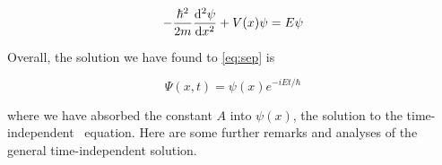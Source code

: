 \begin{tcolorbox}[title = Time-independent \Sch\ equation] \vspace{-2ex}
	\begin{equation*}
		-\frac{\hbar^2}{2m} \dv[2]{\psi}{x} + V(x)\psi = E\psi
	\end{equation*}
\end{tcolorbox}

Overall, the solution we have found to \autoref{eq:sep} is

\begin{equation}
	\Psi(x,t) = \psi(x)e^{-iEt/\hbar}
\end{equation}

\noindent where we have absorbed the constant $A$ into $\psi(x)$, the solution to the time-independent \Sch\ equation. Here are some further remarks and analyses of the general time-independent solution.

